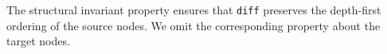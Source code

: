 \documentclass{sigplanconf}
\theoremstyle{plain}
\newtheorem{prop}{Proposition}
\begin{document}
The structural invariant property ensures that \texttt{diff} preserves
the depth-first ordering of the source nodes. We omit the corresponding
property about the target nodes.

\end{document}
